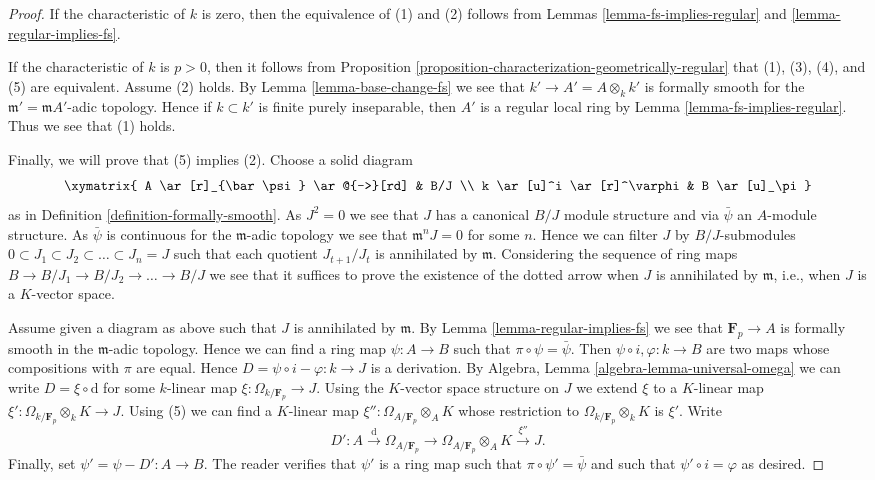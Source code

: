\begin{proof}
If the characteristic of $k$ is zero, then the equivalence of (1) and (2)
follows from
Lemmas \ref{lemma-fs-implies-regular} and \ref{lemma-regular-implies-fs}.

\medskip\noindent
If the characteristic of $k$ is $p > 0$, then it follows from
Proposition \ref{proposition-characterization-geometrically-regular}
that (1), (3), (4), and (5) are equivalent. Assume (2) holds.
By Lemma \ref{lemma-base-change-fs} we see that
$k' \to A' = A \otimes_k k'$ is formally smooth for the
$\mathfrak m' = \mathfrak mA'$-adic topology. Hence if $k \subset k'$ is
finite purely inseparable, then $A'$ is a regular local ring by
Lemma \ref{lemma-fs-implies-regular}. Thus we see that (1) holds.

\medskip\noindent
Finally, we will prove that (5) implies (2). Choose a solid diagram
$$
\xymatrix{
A \ar[r]_{\bar\psi} \ar@{-->}[rd] & B/J \\
k \ar[u]^i \ar[r]^\varphi & B \ar[u]_\pi
}
$$
as in Definition \ref{definition-formally-smooth}. As $J^2 = 0$ we see
that $J$ has a canonical $B/J$ module structure and via $\bar\psi$ an
$A$-module structure. As $\bar\psi$ is continuous for the
$\mathfrak m$-adic topology we see that $\mathfrak m^nJ = 0$ for some $n$.
Hence we can filter $J$ by $B/J$-submodules
$0 \subset J_1 \subset J_2 \subset \ldots \subset J_n = J$
such that each quotient $J_{t + 1}/J_t$ is annihilated by $\mathfrak m$.
Considering the sequence of ring maps
$B \to B/J_1 \to B/J_2 \to \ldots \to B/J$
we see that it suffices to prove the existence of the dotted arrow when
$J$ is annihilated by $\mathfrak m$, i.e., when $J$ is a $K$-vector space.

\medskip\noindent
Assume given a diagram as above such that $J$ is annihilated by $\mathfrak m$.
By Lemma \ref{lemma-regular-implies-fs} we see that $\mathbf{F}_p \to A$ is
formally smooth in the $\mathfrak m$-adic topology. Hence we can find a ring
map $\psi : A \to B$ such that $\pi \circ \psi = \bar \psi$. Then
$\psi \circ i, \varphi : k \to B$ are two maps whose compositions with $\pi$
are equal. Hence $D = \psi \circ i - \varphi : k \to J$ is a derivation.
By Algebra, Lemma \ref{algebra-lemma-universal-omega} we can write
$D = \xi \circ \text{d}$ for some $k$-linear map
$\xi : \Omega_{k/\mathbf{F}_p} \to J$. Using the $K$-vector space structure
on $J$ we extend $\xi$ to a $K$-linear map
$\xi' : \Omega_{k/\mathbf{F}_p} \otimes_k K \to J$.
Using (5) we can find a $K$-linear map
$\xi'' : \Omega_{A/\mathbf{F}_p} \otimes_A K$ whose restriction to
$\Omega_{k/\mathbf{F}_p} \otimes_k K$ is $\xi'$. Write
$$
D' : A \xrightarrow{\text{d}} \Omega_{A/\mathbf{F}_p}
\to \Omega_{A/\mathbf{F}_p} \otimes_A K \xrightarrow{\xi''} J.
$$
Finally, set $\psi' = \psi - D' : A \to B$. The reader verifies that $\psi'$
is a ring map such that $\pi \circ \psi' = \bar \psi$ and such that
$\psi' \circ i = \varphi$ as desired.
\end{proof}

